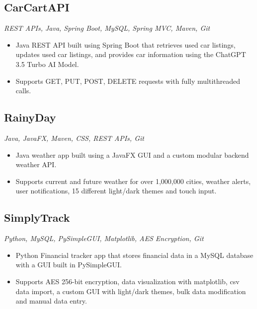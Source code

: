 \documentclass[10pt, a4paper]{article}
\begin{document}
\subsection*{CarCartAPI }
\vspace*{2pt}
\textit{REST APIs, Java, Spring Boot, MySQL, Spring MVC, Maven, Git}
\begin{itemize}
    \item Java REST API built using Spring Boot that retrieves used car listings, updates used car listings, and provides car information using the ChatGPT 3.5 Turbo AI Model.
    \item Supports GET, PUT, POST, DELETE requests with fully multithreaded calls.
\end{itemize}

\subsection*{RainyDay }
\vspace*{2pt}
\textit{Java, JavaFX, Maven, CSS, REST APIs, Git}
\begin{itemize}
    \item Java weather app built using a JavaFX GUI and a custom modular backend weather API.
    \item Supports current and future weather for over 1,000,000 cities, weather alerts, user notifications, 15 different light/dark themes and touch input.
\end{itemize}

\subsection*{SimplyTrack }
\vspace*{2pt}
\textit{Python, MySQL, PySimpleGUI, Matplotlib, AES Encryption, Git}
\begin{itemize}
    \item Python Financial tracker app that stores financial data in a MySQL database with a GUI built in PySimpleGUI.
    \item Supports AES 256-bit encryption, data visualization with matplotlib, csv data import, a custom GUI with light/dark themes, bulk data modification and manual data entry.
\end{itemize}
\end{document}
